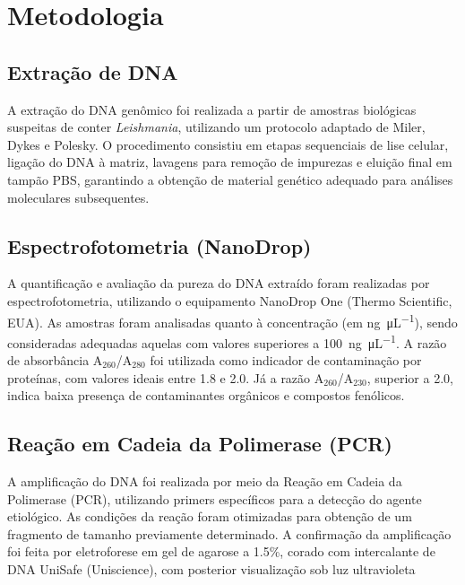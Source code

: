 \section{Metodologia}

\subsection{Extração de DNA}

A extração do DNA genômico foi realizada a partir de amostras biológicas
suspeitas de conter \textit{Leishmania}, utilizando um protocolo adaptado de
Miler, Dykes e Polesky\cite{SODEmiller1988}.  O procedimento consistiu em
etapas sequenciais de lise celular, ligação do DNA à matriz, lavagens para
remoção de impurezas e eluição final em tampão PBS, garantindo a obtenção de
material genético adequado para análises moleculares subsequentes.

\subsection{Espectrofotometria (NanoDrop)}

A quantificação e avaliação da pureza do DNA extraído foram realizadas por
espectrofotometria, utilizando o equipamento NanoDrop One (Thermo Scientific,
EUA). As amostras foram analisadas quanto à concentração (em \unit{\nano\gram\per\micro\liter}), sendo
consideradas adequadas aquelas com valores superiores a \qty{100}{\nano\gram\per\micro\liter}. A razão de
absorbância A$_{260}$/A$_{280}$ foi utilizada como indicador de contaminação por
proteínas, com valores ideais entre \num{1,8} e \num{2.0}. Já a razão
A$_{260}$/A$_{230}$, superior a \num{2.0}, indica baixa presença de contaminantes
orgânicos e compostos fenólicos.

\subsection{Reação em Cadeia da Polimerase (PCR)}

A amplificação do DNA foi realizada por meio da Reação em Cadeia da Polimerase
(PCR), utilizando primers específicos para a detecção do agente etiológico. As
condições da reação foram otimizadas para obtenção de um fragmento de tamanho
previamente determinado. A confirmação da amplificação foi feita por
eletroforese em gel de agarose a \num{1.5}\%, corado com intercalante de DNA UniSafe
(Uniscience), com posterior visualização sob luz ultravioleta

